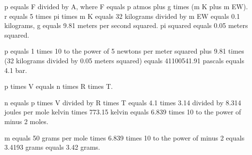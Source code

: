 p equals F divided by A, where F equals p atmos plus g times (m K plus m EW).  
r equals 5 times pi times m K equals 32 kilograms divided by m EW equals 0.1 kilograms, g equals 9.81 meters per second squared.  
pi squared equals 0.05 meters squared.  

p equals 1 times 10 to the power of 5 newtons per meter squared plus 9.81 times (32 kilograms divided by 0.05 meters squared) equals 41100541.91 pascals equals 4.1 bar.  

p times V equals n times R times T.  

n equals p times V divided by R times T equals 4.1 times 3.14 divided by 8.314 joules per mole kelvin times 773.15 kelvin equals 6.839 times 10 to the power of minus 2 moles.  

m equals 50 grams per mole times 6.839 times 10 to the power of minus 2 equals 3.4193 grams equals 3.42 grams.